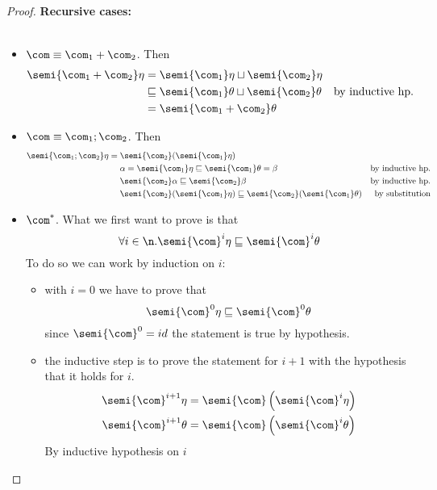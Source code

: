 \begin{proof}
  \noindent
  \textbf{Recursive cases:}\ \\ \
  \begin{itemize}
  \item \(\com \equiv \com_1 + \com_2\). Then
    \begin{align*}
      \semi{\com_1 + \com_2}\eta & = \semi{\com_1}\eta \sqcup \semi{\com_2}\eta & \\
      & \sqsubseteq \semi{\com_1}\theta \sqcup \semi{\com_2}\theta & \text{by inductive hp.} \\
      & = \semi{\com_1 + \com_2}\theta
    \end{align*}
  \item \(\com \equiv \com_1 ; \com_2\). Then
    \begin{align*}
      \semi{\com_1;\com_2}\eta = \; & \semi{\com_2}(\semi{\com_1}\eta) & \\
      & \alpha = \semi{\com_1}\eta \sqsubseteq \semi{\com_1}\theta = \beta & \text{by inductive hp.} \\
      & \semi{\com_2}\alpha \sqsubseteq \semi{\com_2}\beta & \text{by inductive hp.} \\
      & \semi{\com_2}(\semi{\com_1}\eta) \sqsubseteq \semi{\com_2}(\semi{\com_1}\theta) & \text{by substitution}
    \end{align*}
  \item \(\com^*\). What we first want to prove is that
    \begin{equation*}
      \forall i \in \n . \semi{\com}^i\eta \sqsubseteq
      \semi{\com}^i\theta
    \end{equation*}
    To do so we can work by induction on \(i\):
    \begin{itemize}
    \item with \(i=0\) we have to prove that
      \begin{equation*}
        \semi{\com}^0 \eta \sqsubseteq \semi{\com}^0 \theta
      \end{equation*}
      since \(\semi{\com}^0 = id\) the statement is true by
      hypothesis.
    \item the inductive step is to prove the statement for \(i+1\)
      with the hypothesis that it holds for \(i\).
      \begin{align*}
        \semi{\com}^{i+1} \eta & = \semi{\com}\left(\semi{\com}^{i} \eta \right) \\
        \semi{\com}^{i+1} \theta & = \semi{\com}\left(\semi{\com}^{i} \theta \right)
      \end{align*}
      By inductive hypothesis on \(i\)

\end{itemize}
\end{itemize}
\end{proof}
